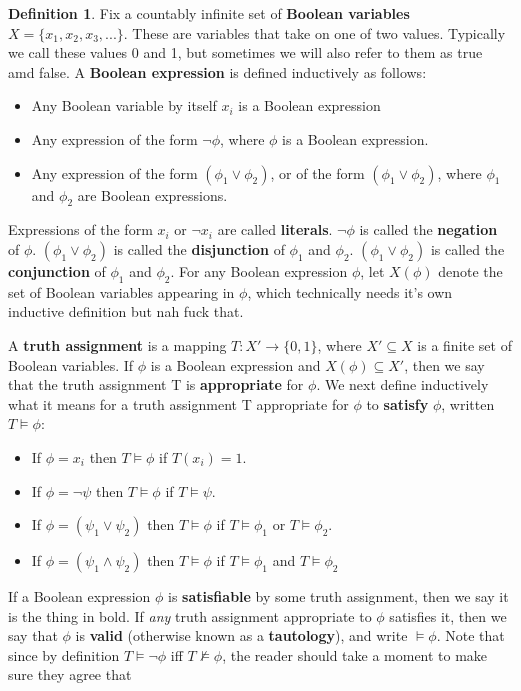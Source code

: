 \documentclass{article}
\theoremstyle{definition}
\newtheorem{definition}{Definition}[section]
\theoremstyle{plain}
\theoremstyle{theorem}
\begin{document}
\begin{definition}
Fix a countably infinite set of \textbf{Boolean variables} $X = \{x_1,x_2,x_3,...\}$. These are variables that take on one of two values. Typically we call these values 0 and 1, but sometimes we will also refer to them as true amd false. A \textbf{Boolean expression} is defined inductively as follows:
\begin{itemize}
\item Any Boolean variable by itself $x_i$ is a Boolean expression
\item Any expression of the form $\neg \phi$, where $\phi$ is a Boolean expression.
\item Any expression of the form $(\phi_1 \vee \phi_2)$, or of the form $(\phi_1 \vee \phi_2)$, where $\phi_1$ and $\phi_2$ are Boolean expressions.
\end{itemize}
Expressions of the form $x_i$ or $\neg x_i$ are called \textbf{literals}. $\neg \phi$ is called the \textbf{negation} of $\phi$. $(\phi_1 \vee \phi_2)$ is called the \textbf{disjunction} of $\phi_1$ and $\phi_2$. $(\phi_1 \vee \phi_2)$ is called the \textbf{conjunction} of $\phi_1$ and $\phi_2$. For any Boolean expression $\phi$, let $X(\phi)$ denote the set of Boolean variables appearing in $\phi$, which technically needs it's own inductive definition but nah fuck that.
\par A \textbf{truth assignment} is a mapping $T:X' \to \{0,1\}$, where $X' \subseteq X$ is a finite set of Boolean variables. If $\phi$ is a Boolean expression and $X(\phi) \subseteq X'$, then we say that the truth assignment T is \textbf{appropriate} for $\phi$. We next define inductively what it means for a truth assignment T appropriate for $\phi$ to \textbf{satisfy} $\phi$, written $T \models \phi$:
\begin{itemize}
    \item If $\phi=x_i$ then $T \models \phi$ if $T(x_i)=1$.
    \item If $\phi=\neg \psi$ then $T \models \phi$ if $T \models \psi$.
    \item If $\phi = (\psi_1 \vee \psi_2)$ then $T \models \phi$ if $T \models \phi_1$ or $T \models \phi_2$. 
    \item If $\phi = (\psi_1 \wedge \psi_2)$ then $T \models \phi$ if $T \models \phi_1$ and $T \models \phi_2$
\end{itemize}
If a Boolean expression $\phi$ is \textbf{satisfiable} by some truth assignment, then we say it is the thing in bold. If \textit{any} truth assignment appropriate to $\phi$ satisfies it, then we say that $\phi$ is \textbf{valid} (otherwise known as a \textbf{tautology}), and write $\models \phi$. Note that since by definition $T \models \neg \phi$ iff $T \nvDash \phi$, the reader should take a moment to make sure they agree that

\end{definition}
\end{document}
